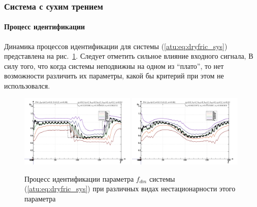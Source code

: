 \documentclass[10pt,utf8]{beamer}
\begin{document}
\begin{frame}
  \frametitle{Система с сухим трением}
  \framesubtitle{Процесс идентификации}

  Динамика процессов идентификации для системы (\ref{atu:eq:dryfric_sys}) представлена на рис.~\ref{atu:f:fric_id}.
  Следует отметить сильное влияние входного сигнала, В силу того, что когда системы неподвижны
  на одном из ``плато'', то нет возможности различить их параметры,
  какой бы критерий при этом не использовался.

  \begin{figure}[htb!]
    \centerline{
      \includegraphics[width=0.49\textwidth]{p/fric/fric_m5p-pl_n_sign.png}
    \includegraphics[width=0.49\textwidth]{p/fric/fric_m5p-pl_n_sin.png}
  }
    \caption{Процесс идентификации параметра $f_{dm}$ системы (\ref{atu:eq:dryfric_sys})
    при различных видах нестационарности этого параметра
    }
    \label{atu:f:fric_id}
  \end{figure}
\end{frame}





\end{document}
